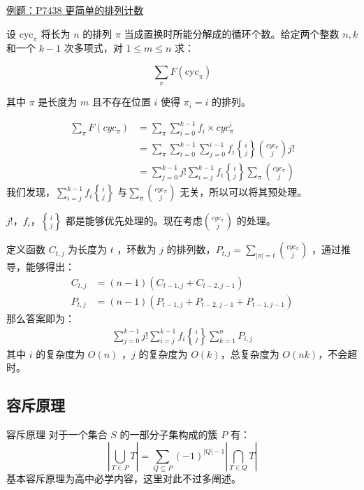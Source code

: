 \documentclass[UTF8]{beamer}
\begin{document}
    \begin{frame}
      \href{https://www.luogu.com.cn/problem/P7438}{例题：P7438 更简单的排列计数}

      设 \(\text{cyc}_\pi\) 将长为 \(n\) 的排列 \(\pi\)
      当成置换时所能分解成的循环个数。给定两个整数 \(n,k\) 和一个 \(k-1\)
      次多项式，对 \(1\leq m\leq n\) 求：

      \[
      \sum\limits_{\pi}F(\text{cyc}_{\pi})
      \]

      其中 \(\pi\) 是长度为 \(m\) 且不存在位置 \(i\) 使得 \(\pi_i=i\) 的排列。
    \end{frame}
    \begin{frame}
      \[
      \begin{aligned}
      \sum\limits_{\pi}F(cyc_\pi)&=\sum\limits_\pi\sum\limits_{i=0}^{k-1}f_i\times cyc_\pi^i \\
      &=\sum\limits_\pi\sum\limits_{i=0}^{k-1}\sum\limits_{j=0}^{i-1} f_i{i \brace j}{cyc_\pi \choose j}j! \\
      &=\sum\limits_{j=0}^{k-1}j!\sum\limits_{i=j}^{k-1}f_i {i \brace j}\sum\limits_\pi{cyc_\pi \choose j}
      \end{aligned}
      \] 
      \pause
      我们发现，\(\sum\limits_{i=j}^{k-1}f_i {i \brace j}\) 与\(\sum\limits_\pi{cyc_\pi \choose j}\) 无关，所以可以将其预处理。

      \(j!，f_i，{i \brace j}\) 都是能够优先处理的。现在考虑\({cyc_\pi \choose j}\) 的处理。
    \end{frame}

    \begin{frame}
      定义函数 \(C_{t,j}\) 为长度为 \(t\) ，环数为 \(j\)
      的排列数，\(P_{t,j}=\sum\limits_{{|\pi |}=t}{cyc_\pi \choose j}\)
      ，通过推导，能够得出： 
      \[
      \begin{aligned}
      C_{t,j}&=(n-1)(C_{t-1,j}+C_{t-2,j-1}) \\
      P_{t,j}&=(n-1)(P_{t-1,j}+P_{t-2,j-1}+P_{t-1,j-1})
      \end{aligned}
      \] 
      \pause
      那么答案即为： 
      \[
      \begin{aligned}
      \sum\limits_{j=0}^{k-1}j!\sum\limits_{i=j}^{k-1}f_i {i \brace j}\sum\limits_{k=1}^nP_{i,j}
      \end{aligned}
      \] 
      其中 \(i\) 的复杂度为 \(O(n)\) ，\(j\) 的复杂度为
      \(O(k)\)，总复杂度为 \(O(nk)\)，不会超时。
    \end{frame}

  \subsection{容斥原理}
    \begin{frame}{容斥原理}
      对于一个集合 \(S\) 的一部分子集构成的簇 \(P\) 有： \[
      |\bigcup\limits_{T\in P}T|=\sum\limits_{Q \subseteq P}(-1)^{|Q|-1}|\bigcap\limits_{T
      \in Q}T|
      \] 基本容斥原理为高中必学内容，这里对此不过多阐述。
    \end{frame}
\end{document}
